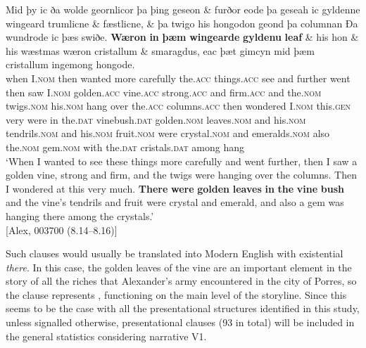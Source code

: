 \documentclass[output=paper,colorlinks,citecolor=brown]{langscibook}
\begin{document}
\ea%
\label{ex:cichosz:8}
\gll Mid þy   ic   ða   wolde   geornlicor   þa     þing     geseon   \& furðor   eode   þa   geseah   ic   gyldenne   wingeard   trumlicne   \& fæstlicne,   \& þa     twigo     his     hongodon geond   þa     columnan   Ða   wundrode   ic   þæs swiðe. \textbf{Wæron}   \textbf{in}   \textbf{þæm}     \textbf{wingearde}   \textbf{gyldenu}   \textbf{leaf} \& his     hon     \& his     wæstmas   wæron cristallum   \& smaragdus,   eac   þæt     gimcyn     mid þæm     cristallum   ingemong   hongode.\\
when  I.\textsc{nom}  then  wanted  more carefully  the.\textsc{acc}  things.\textsc{acc}  see  and further   went  then  saw  I.\textsc{nom}  golden.\textsc{acc}  vine.\textsc{acc}  strong.\textsc{acc}  and firm.\textsc{acc}  and  the.\textsc{nom}  twigs.\textsc{nom}  his.\textsc{nom}  hang over  the.\textsc{acc}   columns.\textsc{acc}   then  wondered  I.\textsc{nom}  this.\textsc{gen} very   were    in   the.\textsc{dat}  vinebush.\textsc{dat}   golden.\textsc{nom}  leaves.\textsc{nom} and   his.\textsc{nom}   tendrils.\textsc{nom}  and  his.\textsc{nom}  fruit.\textsc{nom}  were crystal.\textsc{nom}  and  emeralds.\textsc{nom}  also  the.\textsc{nom}  gem.\textsc{nom}   with the.\textsc{dat}  cristals.\textsc{dat}   among    hang\\
\glt ‘When I wanted to see these things more carefully and went further, then I saw a golden vine, strong and firm, and the twigs were hanging over the columns. Then I wondered at this very much. \textbf{There} \textbf{were} \textbf{golden} \textbf{leaves} \textbf{in} \textbf{the} \textbf{vine} \textbf{bush} and the vine's tendrils and fruit were crystal and emerald, and also a gem was hanging there among the crystals.' \\ \hfill [Alex, 003700 (8.14--8.16)]
\z 

Such clauses would usually be translated into Modern English with existential \textit{there}. In this case, the golden leaves of the vine are an important element in the story of all the riches that Alexander's army encountered in the city of Porres, so the clause represents , functioning on the main level of the storyline. Since this seems to be the case with all the presentational structures identified in this study, unless signalled otherwise, presentational clauses (93 in total) will be included in the general statistics considering narrative V1.
\end{document}
